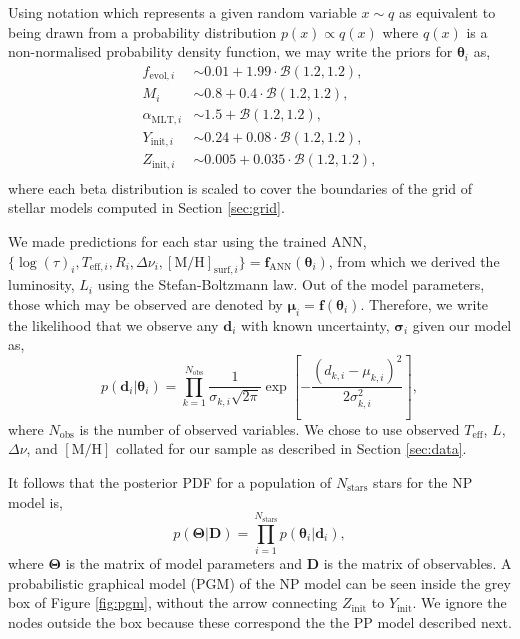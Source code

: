 \documentclass[a4paper,fleqn,usenatbib]{mnras}
\newcommand{\dnu}{\ensuremath{\Delta\nu}}
\newcommand{\metallicity}{\ensuremath{[\mathrm{M}/\mathrm{H}]}}
\newcommand{\teff}{\ensuremath{T_\mathrm{eff}}}
\begin{document}
Using notation which represents a given random variable $x \sim q$ as equivalent to being drawn from a probability distribution $p(x) \propto q(x)$ where $q(x)$ is a non-normalised probability density function, we may write the priors for $\boldsymbol{\theta}_i$ as,
%
\begin{align*}
    f_{\mathrm{evol}, i} &\sim 0.01 + 1.99 \cdot \mathcal{B}(1.2, 1.2),\\
    M_i &\sim 0.8 + 0.4 \cdot \mathcal{B}(1.2, 1.2),\\
    \alpha_{\mathrm{MLT}, i} &\sim 1.5 + \mathcal{B}(1.2, 1.2),\\
    Y_{\mathrm{init}, i} &\sim 0.24 + 0.08 \cdot \mathcal{B}(1.2, 1.2),\\
    Z_{\mathrm{init}, i} &\sim 0.005 + 0.035 \cdot \mathcal{B}(1.2, 1.2),\\
\end{align*}
%
where each beta distribution is scaled to cover the boundaries of the grid of stellar models computed in Section \ref{sec:grid}.

We made predictions for each star using the trained ANN, $\{\log(\tau)_i, T_{\mathrm{eff}, i}, R_i, \dnu_i, \metallicity_{\mathrm{surf}, i}\} = \boldsymbol{f}_{\mathrm{ANN}}(\boldsymbol{\theta}_i)$, from which we derived the luminosity, $L_i$ using the Stefan-Boltzmann law. Out of the model parameters, those which may be observed are denoted by ${\boldsymbol{\mu}}_{i} = {\boldsymbol{f}}(\boldsymbol{\theta}_i)$. Therefore, we write the likelihood that we observe any $\boldsymbol{d}_i$ with known uncertainty, $\boldsymbol{\sigma}_{i}$ given our model as,
%
\begin{equation}
    p(\boldsymbol{d}_i | \boldsymbol{\theta}_i) = \prod_{k=1}^{N_\mathrm{obs}} \frac{1}{\sigma_{k, i} \sqrt{2\pi}} \exp\left[ - \frac{(d_{k, i} - \mu_{k, i})^2}{2 \sigma_{k, i}^2} \right],
    \label{eq:like}
\end{equation}
%
where $N_\mathrm{obs}$ is the number of observed variables. We chose to use observed $\teff$, $L$, $\dnu$, and $\metallicity$ collated for our sample as described in Section \ref{sec:data}.

It follows that the posterior PDF for a population of $N_\mathrm{stars}$ stars for the NP model is, 
%
\begin{equation}
    p(\boldsymbol{\Theta} | \boldsymbol{D}) = \prod_{i=1}^{N_{\mathrm{stars}}} p(\boldsymbol{\theta}_i | \boldsymbol{d}_i),   
\end{equation}
%
where $\boldsymbol{\Theta}$ is the matrix of model parameters and $\boldsymbol{D}$ is the matrix of observables. A probabilistic graphical model (PGM) of the NP model can be seen inside the grey box of Figure \ref{fig:pgm}, without the arrow connecting $Z_\mathrm{init}$ to $Y_\mathrm{init}$. We ignore the nodes outside the box because these correspond the the PP model described next.
\end{document}
